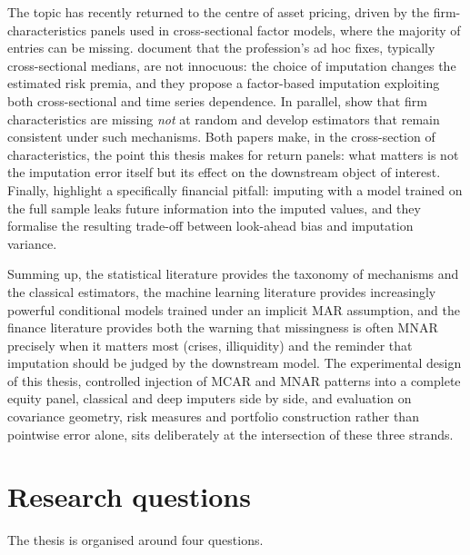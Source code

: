 The topic has recently returned to the centre of asset pricing,
driven by the firm-characteristics panels used in cross-sectional
factor models, where the majority of entries can be missing.
\citet{bryzgalova2025} document that the profession's ad hoc fixes,
typically cross-sectional medians, are not innocuous: the choice of
imputation changes the estimated risk premia, and they propose a
factor-based imputation exploiting both cross-sectional and time
series dependence. In parallel, \citet{freyberger2025} show that firm
characteristics are missing \emph{not} at random and develop
estimators that remain consistent under such mechanisms. Both papers
make, in the cross-section of characteristics, the point this thesis
makes for return panels: what matters is not the imputation error
itself but its effect on the downstream object of interest. Finally,
\citet{wasserstein2021} highlight a specifically financial pitfall:
imputing with a model trained on the full sample leaks future
information into the imputed values, and they formalise the resulting
trade-off between look-ahead bias and imputation variance.

Summing up, the statistical literature provides the taxonomy of
mechanisms and the classical estimators, the machine learning
literature provides increasingly powerful conditional models trained
under an implicit MAR assumption, and the finance literature provides
both the warning that missingness is often MNAR precisely when it
matters most (crises, illiquidity) and the reminder that imputation
should be judged by the downstream model. The experimental design of
this thesis, controlled injection of MCAR and MNAR patterns into a
complete equity panel, classical and deep imputers side by side, and
evaluation on covariance geometry, risk measures and portfolio
construction rather than pointwise error alone, sits deliberately at
the intersection of these three strands.

\section{Research questions}
\label{sec:questions}

The thesis is organised around four questions.

